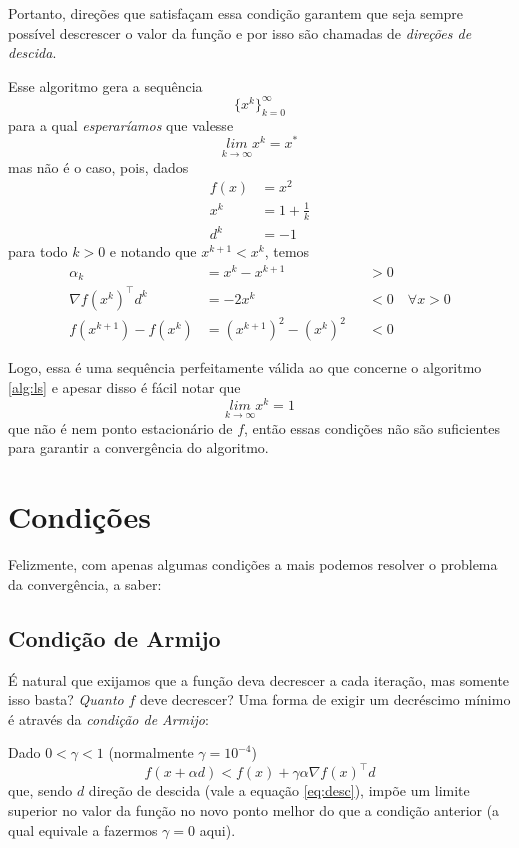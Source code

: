 \documentclass[a4paper,11pt]{article}
\begin{document}
        Portanto, direções que satisfaçam essa condição garantem que seja sempre possível descrescer o valor da função e por isso
        são chamadas de \emph{direções de descida}.

        Esse algoritmo gera a sequência
            $$ \{x^k\}_{k = 0}^\infty $$
        para a qual \emph{esperaríamos} que valesse
            $$ \underset{k \rightarrow \infty}{lim} x^k = x^*$$
        mas não é o caso, pois, dados
            \begin{align*}
                f(x) &= {x}^2 \\
                x^k  &= 1 + \frac{1}{k} \\
                d^k  &= -1
            \end{align*}
        para todo $k > 0$ e notando que $x^{k+1} < x^{k}$, temos
        \begin{align*}
            \alpha_k &= x^k - x^{k+1}  & &> 0 \\
            \nabla f(x^k)^\top d^k &= -2x^k & &< 0 \quad \forall x > 0 \\
            f(x^{k+1}) - f(x^k) &= (x^{k+1})^2 - (x^{k})^2 & &< 0
        \end{align*}

        Logo, essa é uma sequência perfeitamente válida ao que concerne o algoritmo \ref{alg:ls} e apesar disso é fácil notar que
            $$ \underset{k \rightarrow \infty}{lim} x^k = 1$$
        que não é nem ponto estacionário de $f$, então essas condições não são suficientes para garantir a convergência do algoritmo.
    \section*{Condições}
        Felizmente, com apenas algumas condições a mais podemos resolver o problema da convergência, a saber:

        \subsection*{Condição de Armijo}
            É natural que exijamos que a função deva decrescer a cada iteração, mas somente isso basta? \emph{Quanto} $f$
            deve decrescer? Uma forma de exigir um decréscimo mínimo é através da \emph{condição de Armijo}:

            Dado $0 < \gamma < 1$ (normalmente $\gamma = 10^{-4}$)
                $$ f(x + \alpha d) < f(x) + \gamma \alpha \nabla f(x)^\top d $$
            que, sendo $d$ direção de descida (vale a equação \ref{eq:desc}), impõe um limite superior no valor da função
            no novo ponto melhor do que a condição anterior (a qual equivale a fazermos $\gamma = 0$ aqui).
\end{document}
